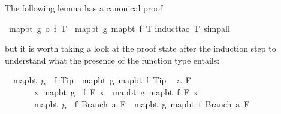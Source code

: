 \begin{isabellebody}
\begin{isamarkuptext}
The following lemma has a canonical proof%
\end{isamarkuptext}%
\ {\isachardoublequote}map{\isacharunderscore}bt\ {\isacharparenleft}g\ o\ f{\isacharparenright}\ T\ {\isacharequal}\ map{\isacharunderscore}bt\ g\ {\isacharparenleft}map{\isacharunderscore}bt\ f\ T{\isacharparenright}{\isachardoublequote}\isanewline
{}induct{\isacharunderscore}tac\ T{\isacharcomma}\ simp{\isacharunderscore}all{\isacharparenright}\isanewline
{}%
\begin{isamarkuptext}%
\noindent
but it is worth taking a look at the proof state after the induction step
to understand what the presence of the function type entails:
\begin{isabelle}
\ \ map{\isacharunderscore}bt\ {\isacharparenleft}g\ {\isasymcirc}\ f{\isacharparenright}\ Tip\ {\isacharequal}\ map{\isacharunderscore}bt\ g\ {\isacharparenleft}map{\isacharunderscore}bt\ f\ Tip{\isacharparenright}\isanewline
\ \ {\isasymAnd}a\ F{\isachardot}\isanewline
\ \ \ \ \ \ \ {\isasymforall}x{\isachardot}\ map{\isacharunderscore}bt\ {\isacharparenleft}g\ {\isasymcirc}\ f{\isacharparenright}\ {\isacharparenleft}F\ x{\isacharparenright}\ {\isacharequal}\ map{\isacharunderscore}bt\ g\ {\isacharparenleft}map{\isacharunderscore}bt\ f\ {\isacharparenleft}F\ x{\isacharparenright}{\isacharparenright}\ {\isasymLongrightarrow}\isanewline
\ \ \ \ \ \ \ map{\isacharunderscore}bt\ {\isacharparenleft}g\ {\isasymcirc}\ f{\isacharparenright}\ {\isacharparenleft}Branch\ a\ F{\isacharparenright}\ {\isacharequal}\ map{\isacharunderscore}bt\ g\ {\isacharparenleft}map{\isacharunderscore}bt\ f\ {\isacharparenleft}Branch\ a\ F{\isacharparenright}{\isacharparenright}
\end{isabelle}%
\end{isamarkuptext}%
\end{isabellebody}%
